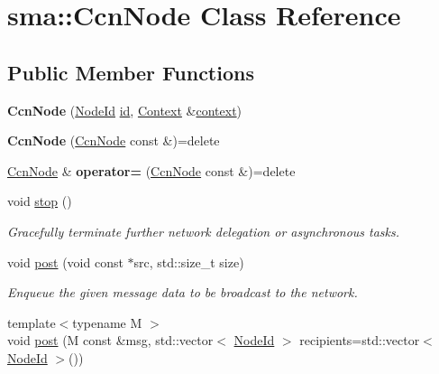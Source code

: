 \hypertarget{classsma_1_1CcnNode}{\section{sma\-:\-:Ccn\-Node Class Reference}
\label{classsma_1_1CcnNode}
}
\subsection*{Public Member Functions}
\begin{DoxyCompactItemize}
\item 
\hypertarget{classsma_1_1CcnNode_a0866edfdb39362136fc88f298dc7ec10}{{\bfseries Ccn\-Node} (\hyperlink{structsma_1_1NodeId}{Node\-Id} \hyperlink{classsma_1_1CcnNode_a5a7ffc5e2e82045309209b1f12738a28}{id}, \hyperlink{structsma_1_1Context}{Context} \&\hyperlink{classsma_1_1CcnNode_abbaf22b4425aed73167cd4388bf75c79}{context})}\label{classsma_1_1CcnNode_a0866edfdb39362136fc88f298dc7ec10}

\item 
\hypertarget{classsma_1_1CcnNode_a7c3cccc963620f001f5bfdba986e72fd}{{\bfseries Ccn\-Node} (\hyperlink{classsma_1_1CcnNode}{Ccn\-Node} const \&)=delete}\label{classsma_1_1CcnNode_a7c3cccc963620f001f5bfdba986e72fd}

\item 
\hypertarget{classsma_1_1CcnNode_a2b7138f7febad84c44a1ed9a42a8ac2e}{\hyperlink{classsma_1_1CcnNode}{Ccn\-Node} \& {\bfseries operator=} (\hyperlink{classsma_1_1CcnNode}{Ccn\-Node} const \&)=delete}\label{classsma_1_1CcnNode_a2b7138f7febad84c44a1ed9a42a8ac2e}

\item 
\hypertarget{classsma_1_1CcnNode_afed60305b098bc12c469ecfbdfca509e}{void \hyperlink{classsma_1_1CcnNode_afed60305b098bc12c469ecfbdfca509e}{stop} ()}\label{classsma_1_1CcnNode_afed60305b098bc12c469ecfbdfca509e}

\begin{DoxyCompactList}\small\item\em Gracefully terminate further network delegation or asynchronous tasks. \end{DoxyCompactList}\item 
\hypertarget{classsma_1_1CcnNode_a970d99585483d0b0fa1c180a773add98}{void \hyperlink{classsma_1_1CcnNode_a970d99585483d0b0fa1c180a773add98}{post} (void const $\ast$src, std\-::size\-\_\-t size)}\label{classsma_1_1CcnNode_a970d99585483d0b0fa1c180a773add98}

\begin{DoxyCompactList}\small\item\em Enqueue the given message data to be broadcast to the network. \end{DoxyCompactList}\item 
\hypertarget{classsma_1_1CcnNode_aa50d8d546a439aa1dbd7ad1c70e5555f}{{\footnotesize template$<$typename M $>$ }\\void \hyperlink{classsma_1_1CcnNode_aa50d8d546a439aa1dbd7ad1c70e5555f}{post} (M const \&msg, std\-::vector$<$ \hyperlink{structsma_1_1NodeId}{Node\-Id} $>$ recipients=std\-::vector$<$ \hyperlink{structsma_1_1NodeId}{Node\-Id} $>$())}\label{classsma_1_1CcnNode_aa50d8d546a439aa1dbd7ad1c70e5555f}


\end{DoxyCompactItemize}
